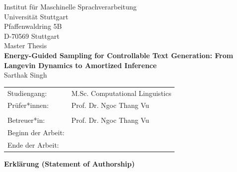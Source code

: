 \documentclass[12pt,leqno,a4paper]{report}
\begin{document}
\thispagestyle{empty}
\begin{center}
    {\large Institut f\"ur Maschinelle Sprachverarbeitung}\\
    {\large Universit\"at Stuttgart}\\
    {\large Pfaffenwaldring 5B}\\
    {\large D-70569 Stuttgart}\\[3cm]

    {\large Master Thesis}\\[1.2cm]

    {\LARGE\bfseries Energy-Guided Sampling for Controllable Text Generation: From Langevin Dynamics to Amortized Inference}\\[2cm]

    {\large Sarthak Singh}\\[2cm]

    \begin{tabular}{ll}
        Studiengang: & M.Sc. Computational Linguistics\\[0.6cm]
        Pr\"ufer*innen: & Prof. Dr. Ngoc Thang Vu\\
                        & \\[0.6cm] %
        Betreuer*in: & Prof. Dr. Ngoc Thang Vu\\[1.2cm]
        Beginn der Arbeit: & \\ %
        Ende der Arbeit: & \\ %
    \end{tabular}
\end{center}
\clearpage

\thispagestyle{empty}
\noindent\textbf{Erkl\"arung (Statement of Authorship)}\\[0.4cm]
\end{document}
